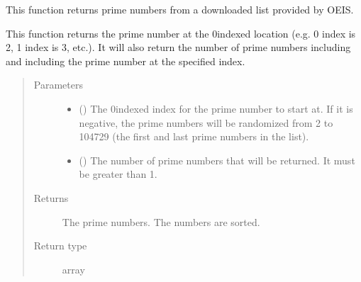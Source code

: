 \documentclass[letterpaper,10pt,english]{sphinxmanual}
\begin{document}
\begin{fulllineitems}
\label{\detokenize{docstrings/ifa_smeargle.core.mathematics:ifa_smeargle.core.mathematics.generate_prime_numbers}}
This function returns prime numbers from a downloaded list
provided by OEIS.

This function returns the prime number at the 0\sphinxhyphen{}indexed
location (e.g. 0 index is 2, 1 index is 3, etc.). It will
also return the  number of prime numbers including and
including the prime number at the specified index.
\begin{quote}\begin{description}
\item[{Parameters}] \leavevmode\begin{itemize}
\item {} 
 () \textendash{} The 0\sphinxhyphen{}indexed index for the prime number to start at. If it
is negative, the prime numbers will be randomized from
2 to 104729 (the first and last prime numbers in the list).

\item {} 
 () \textendash{} The number of prime numbers that will be returned. It must
be greater than 1.

\end{itemize}

\item[{Returns}] \leavevmode
{} \textendash{} The prime numbers. The numbers are sorted.

\item[{Return type}] \leavevmode
array

\end{description}\end{quote}

\end{fulllineitems}

\end{document}

